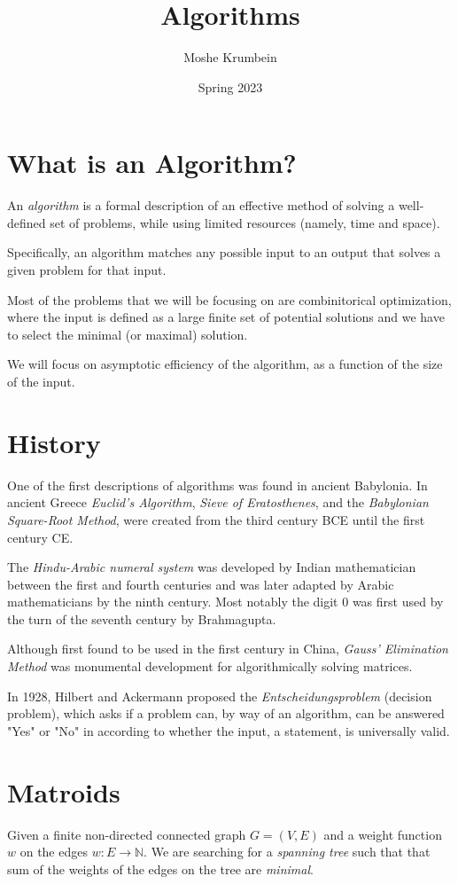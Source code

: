 \documentclass[00_complete]{subfiles}
\title{Algorithms}
\author{Moshe Krumbein}
\date{Spring 2023}
\begin{document}
\section{What is an Algorithm?}
An \textit{algorithm} is a formal description of an effective method of solving
a well-defined set of problems, while using limited resources (namely, time and
space).

Specifically, an algorithm matches any possible input to an output that solves a
given problem for that input.

Most of the problems that we will be focusing on are combinitorical
optimization, where the input is defined as a large finite set of potential
solutions and we have to select the minimal (or maximal) solution.

We will focus on asymptotic efficiency of the algorithm, as a function of the
size of the input.

\section{History}
One of the first descriptions of algorithms was found in ancient Babylonia. In
ancient Greece \textit{Euclid's Algorithm}, \textit{Sieve of Eratosthenes}, and
the \textit{Babylonian Square-Root Method}, were created from the third century
BCE until the first century CE.

The \textit{Hindu-Arabic numeral system} was developed by Indian mathematician
between the first and fourth centuries and was later adapted by Arabic
mathematicians by the ninth century. Most notably the digit $0$ was first used
by the turn of the seventh century by Brahmagupta.

Although first found to be used in the first century in China, \textit{Gauss'
Elimination Method} was monumental development for algorithmically solving
matrices.

In 1928, Hilbert and Ackermann proposed the \textit{Entscheidungsproblem}
(decision problem), which asks if a problem can, by way of an algorithm, can be
answered "Yes" or "No" in according to whether the input, a statement, is
universally valid. 
\section{Matroids}

Given a finite non-directed connected graph $ G=(V,E) $ and a weight
function $ w $ on the edges $ w: E \to \mathbb{N} $. We are searching for a
\textit{spanning tree} such that that sum of the weights of the edges on the
tree are \textit{minimal}.
\end{document}
